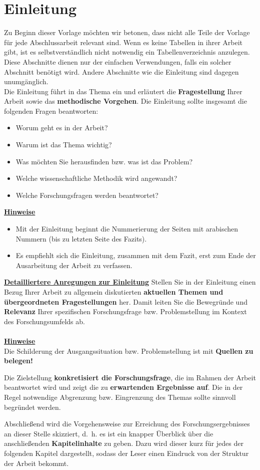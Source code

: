 \section{Einleitung}\label{sec:einleitung}

Zu Beginn dieser Vorlage möchten wir betonen, dass nicht alle Teile der Vorlage für jede Abschlussarbeit relevant sind. Wenn es keine Tabellen in ihrer Arbeit gibt, ist es selbstverständlich nicht notwendig ein Tabellenverzeichnis anzulegen. Diese Abschnitte dienen nur der einfachen Verwendungen, falls ein solcher Abschnitt benötigt wird. Andere Abschnitte wie die Einleitung sind dagegen unumgänglich.\\

Die Einleitung führt in das Thema ein und erläutert die \textbf{Fragestellung} Ihrer Arbeit sowie das \textbf{methodische Vorgehen}. Die Einleitung sollte insgesamt die folgenden Fragen beantworten: 
\begin{itemize}
    \item Worum geht es in der Arbeit?
    \item Warum ist das Thema wichtig?
    \item Was möchten Sie herausfinden bzw. was ist das Problem?
    \item Welche wissenschaftliche Methodik wird angewandt?
    \item Welche Forschungsfragen werden beantwortet?
\end{itemize}

\textbf{\uline{Hinweise}}
\begin{itemize}
    \item Mit der Einleitung beginnt die Nummerierung der Seiten mit arabischen Nummern (bis zu letzten Seite des Fazits).
    \item Es empfiehlt sich die Einleitung, zusammen mit dem Fazit, erst zum Ende der Ausarbeitung der Arbeit zu verfassen.
\end{itemize}

\textbf{\uline{Detailliertere Anregungen zur Einleitung}}
Stellen Sie in der Einleitung einen Bezug Ihrer Arbeit zu allgemein diskutierten \textbf{aktuellen Themen und übergeordneten Fragestellungen} her. Damit leiten Sie die Bewegründe und \textbf{Relevanz} Ihrer spezifischen Forschungsfrage bzw. Problemstellung im Kontext des Forschungsumfelds ab.\\
\\
\textbf{\uline{Hinweise}}
\\
Die Schilderung der Ausgangssituation bzw. Problemstellung ist mit \textbf{Quellen zu belegen!}

Die Zielstellung \textbf{konkretisiert die Forschungsfrage}, die im Rahmen der Arbeit beantwortet wird und zeigt die zu \textbf{erwartenden Ergebnisse auf}. Die in der Regel notwendige Abgrenzung bzw. Eingrenzung des Themas sollte sinnvoll begründet werden. 

Abschließend wird die Vorgehensweise zur Erreichung des Forschungsergebnisses an dieser Stelle skizziert, d.~h. es ist ein knapper Überblick über die anschließenden \textbf{Kapitelinhalte} zu geben. Dazu wird dieser kurz für jedes der folgenden Kapitel dargestellt, sodass der Leser einen Eindruck von der Struktur der Arbeit bekommt.